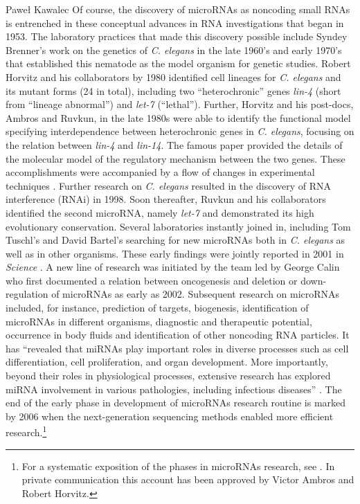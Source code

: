 \begin{artengenv}{Paweł Kawalec}
Of course, the discovery of microRNAs as noncoding small RNAs is entrenched in these conceptual advances in RNA investigations that began in 1953. The laboratory practices that made this discovery possible include Syndey Brenner's work on the genetics of \textit{C. elegans} in the late 1960's and early 1970's that established this nematode as the model organism for genetic studies. Robert Horvitz and his collaborators by 1980 identified cell lineages for \textit{C. elegans} and its mutant forms (24 in total), including two ``heterochronic'' genes \textit{lin-4} (short from ``lineage abnormal'') and \textit{let-7} (``lethal''). Further, Horvitz and his post-docs, Ambros and Ruvkun, in the late 1980s were able to identify the functional model specifying interdependence between heterochronic genes in \textit{C. elegans}, focusing on the relation between \textit{lin-4} and \textit{lin-14}. The famous paper
\parencite[][]{lee_c_1993} %
 provided the details of the molecular model of the regulatory mechanism between the two genes. These accomplishments were accompanied by a flow of changes in experimental techniques 
\parencite[][]{giovagnoli_cognitive_2020}. %
 Further research on \textit{C. elegans} resulted in the discovery of RNA interference (RNAi) in 1998. Soon thereafter, Ruvkun and his collaborators identified the second microRNA, namely \textit{let-7} and demonstrated its high evolutionary conservation. Several laboratories instantly joined in, including Tom Tuschl's and David Bartel's searching for new microRNAs both in \textit{C. elegans} as well as in other organisms. These early findings were jointly reported in 2001 in \textit{Science} 
\parencites[][]{lagos-quintana_identification_2001}[][]{lau_abundant_2001}[][]{lee_extensive_2001}. %
 A new line of research was initiated by the team led by George Calin who first documented a relation between oncogenesis and deletion or down-regulation of microRNAs as early as 2002. Subsequent research on microRNAs included, for instance, prediction of targets, biogenesis, identification of microRNAs in different organisms, diagnostic and therapeutic potential, occurrence in body fluids and identification of other noncoding RNA particles. It has ``revealed that miRNAs play important roles in diverse processes such as cell differentiation, cell proliferation, and organ development. More importantly, beyond their roles in physiological processes, extensive research has explored miRNA involvement in various pathologies, including infectious diseases'' 
\parencite[][p.4246]{fu_circulating_2011}. %
 The end of the early phase in development of microRNAs research routine is marked by 2006 when the next-generation sequencing methods enabled more efficient research.\footnote{For a systematic exposition of the phases in microRNAs research, see 
\parencite[][]{kawalec_transformations_2018}. %
 In private communication this account has been approved by Victor Ambros and Robert Horvitz.}


\end{artengenv}
